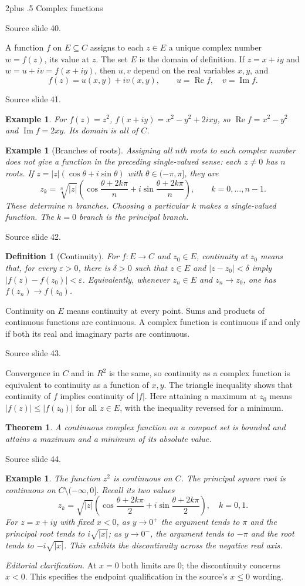 \documentclass[10pt,letterpaper,twoside,openright]{amsbook}
\makeatletter
\numberwithin{equation}{subsection}
\renewcommand{\section}{\@startsection{section}{1}
 {\z@}{2\baselineskip plus .5\baselineskip}
 {\baselineskip}{\normalfont\Large\bfseries\centering}}
\theoremstyle{sea-plain}
\newtheorem{theorem}[subsection]{Theorem}
\theoremstyle{sea-definition}
\newtheorem{definition}[subsection]{Definition}
\newtheorem{example}[subsection]{Example}
\theoremstyle{sea-exercise}
\DeclareMathOperator{\Real}{Re}
\DeclareMathOperator{\Imag}{Im}
\newcommand{\RR}{\mathbb{R}}
\newcommand{\CC}{\mathbb{C}}
\newcommand{\DD}{\mathbb{D}}
\newcommand{\HH}{\mathbb{H}}
\newcommand{\Chat}{\mathbb{C}_{\infty}}
\def\CC{C}\def\RR{R}\def\DD{D}\def\HH{H}\def\Chat{C infinity}}
\newcommand{\src}[1]{\par\smallskip\noindent
 {\scriptsize\sffamily\color{SoftWhite}Source slide #1.}\par\nopagebreak\smallskip}
\newcommand{\editorial}[1]{\par\smallskip\noindent
 {\small\textit{Editorial clarification.} #1}\par\smallskip}
\makeatother
\begin{document}
\section{Complex functions}
\src{40}
A function $f$ on $E\subseteq\CC$ assigns to each $z\in E$ a unique complex
number $w=f(z)$, its value at $z$. The set $E$ is the domain of definition.
If $z=x+iy$ and $w=u+iv=f(x+iy)$, then $u,v$ depend on the real variables
$x,y$, and
\[
 f(z)=u(x,y)+iv(x,y),\qquad u=\Real f,\quad v=\Imag f.
\]
\src{41}
\begin{example}
For $f(z)=z^2$, $f(x+iy)=x^2-y^2+2ixy$, so
$\Real f=x^2-y^2$ and $\Imag f=2xy$. Its domain is all of $\CC$.
\end{example}
\begin{example}[Branches of roots]
Assigning all $n$th roots to each complex number does not give a function
in the preceding single-valued sense: each $z\ne0$ has $n$ roots.
If $z=|z|(\cos\theta+i\sin\theta)$ with $\theta\in(-\pi,\pi]$, they are
\[
 z_k=\sqrt[n]{|z|}
 \left(\cos\frac{\theta+2k\pi}{n}
 +i\sin\frac{\theta+2k\pi}{n}\right),\qquad k=0,\ldots,n-1.
\]
These determine $n$ branches. Choosing a particular $k$ makes a
single-valued function. The $k=0$ branch is the principal branch.
\end{example}
\src{42}
\begin{definition}[Continuity]
For $f:E\to\CC$ and $z_0\in E$, continuity at $z_0$ means that, for every
$\varepsilon>0$, there is $\delta>0$ such that
$z\in E$ and $|z-z_0|<\delta$ imply $|f(z)-f(z_0)|<\varepsilon$.
Equivalently, whenever $z_n\in E$ and $z_n\to z_0$, one has
$f(z_n)\to f(z_0)$.
\end{definition}
Continuity on $E$ means continuity at every point. Sums and products of
continuous functions are continuous. A complex function is continuous if
and only if both its real and imaginary parts are continuous.
\src{43}
Convergence in $\CC$ and in $\RR^2$ is the same, so continuity as a complex
function is equivalent to continuity as a function of $x,y$. The triangle
inequality shows that continuity of $f$ implies continuity of $|f|$.
Here attaining a maximum at $z_0$ means $|f(z)|\leq|f(z_0)|$ for all
$z\in E$, with the inequality reversed for a minimum.
\begin{theorem}
A continuous complex function on a compact set is bounded and attains a
maximum and a minimum of its absolute value.
\end{theorem}
\src{44}
\begin{example}
The function $z^2$ is continuous on $\CC$. The principal square root is
continuous on $\CC\setminus(-\infty,0]$. Recall its two values
\[
 z_k=\sqrt{|z|}
 \left(\cos\frac{\theta+2k\pi}{2}
 +i\sin\frac{\theta+2k\pi}{2}\right),\quad k=0,1.
\]
For $z=x+iy$ with fixed $x<0$, as $y\to0^+$ the argument tends to $\pi$
and the principal root tends to $i\sqrt{|x|}$; as $y\to0^-$, the argument
tends to $-\pi$ and the root tends to $-i\sqrt{|x|}$. This exhibits the
discontinuity across the negative real axis.
\end{example}
\editorial{At $x=0$ both limits are $0$; the discontinuity concerns $x<0$.
This specifies the endpoint qualification in the source's $x\leq0$ wording.}
\end{document}
